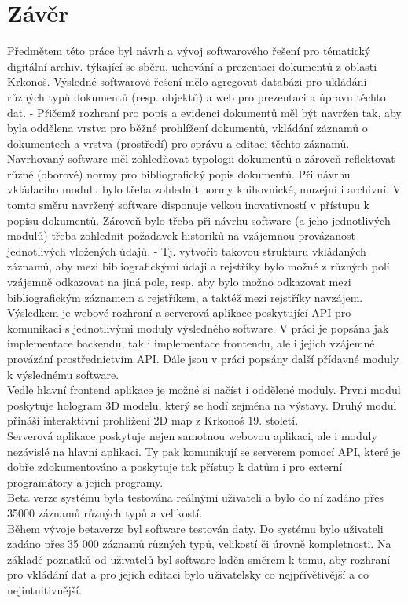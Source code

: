\chapter*{Závěr}

Předmětem této práce byl návrh a vývoj softwarového řešení pro tématický
digitální archiv. týkající se sběru, uchování a prezentaci dokumentů z oblasti
Krkonoš. Výsledné softwarové řešení mělo agregovat databázi pro ukládání různých
typů dokumentů (resp. objektů) a web pro prezentaci a úpravu těchto dat. - Přičemž
rozhraní pro popis a evidenci dokumentů měl být navržen
tak, aby byla oddělena vrstva pro běžné prohlížení dokumentů, vkládání záznamů o
dokumentech a vrstva (prostředí) pro správu a editaci těchto záznamů.
Navrhovaný software měl zohledňovat typologii dokumentů a zároveň reflektovat
různé (oborové) normy pro bibliografický popis dokumentů. Při návrhu vkládacího
modulu bylo třeba zohlednit normy knihovnické, muzejní i archivní. V tomto směru
navržený software disponuje velkou inovativností v přístupu k popisu dokumentů.
Zároveň bylo třeba při návrhu software (a jeho jednotlivých modulů) třeba
zohlednit požadavek historiků na vzájemnou provázanost jednotlivých vložených
údajů. - Tj. vytvořit takovou strukturu vkládaných záznamů, aby mezi
bibliografickými údaji a rejstříky bylo možné z různých polí vzájemně odkazovat
na jiná pole, resp. aby bylo možno odkazovat mezi bibliografickým záznamem a
rejstříkem, a taktéž mezi rejstříky navzájem.
\\

Výsledkem je webové rozhraní a serverová aplikace poskytující API pro komunikaci
s jednotlivými moduly výsledného software. V práci je popsána jak implementace
backendu, tak i implementace frontendu, ale i jejich vzájemné provázání
prostřednictvím API. Dále jsou v práci popsány další přídavné moduly k
výslednému software.
\\

Vedle hlavní frontend aplikace je možné si načíst i oddělené moduly.
První modul poskytuje hologram 3D modelu, který se hodí zejména na výstavy.
Druhý modul přináší interaktivní prohlížení 2D map z Krkonoš 19. století.
\\


Serverová aplikace poskytuje nejen samotnou webovou aplikaci, ale i
moduly nezávislé na hlavní aplikaci. Ty pak komunikují se serverem pomocí API,
které je dobře zdokumentováno a poskytuje tak přístup k datům i pro
externí programátory a jejich programy.
\\


Beta verze systému byla testována reálnými uživateli a bylo do ní
zadáno přes 35000 záznamů různých typů a velikostí.
\\

Během vývoje betaverze byl software testován  daty. Do systému bylo
uživateli zadáno přes 35 000 záznamů různých typů, velikostí či úrovně
kompletnosti. Na základě poznatků od uživatelů byl software laděn směrem k tomu,
aby rozhraní pro vkládání dat a pro jejich editaci bylo uživatelsky co
nejpřívětivější a co nejintuitivnější.
\\
